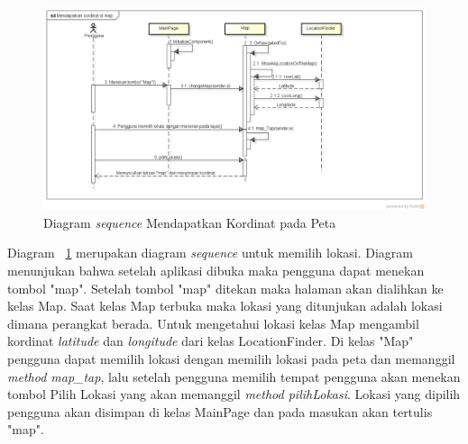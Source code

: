 \begin{figure}[h]
	\centering
		\includegraphics[scale=0.4]{Gambar/sequence/MendapatkanKordinatDiMap}
	\caption{Diagram \textit{sequence} Mendapatkan Kordinat pada Peta}
	\label{fig:sequence lokasi pada peta}
\end{figure}

\hspace{0.5cm} Diagram ~\ref{fig:sequence lokasi pada peta} merupakan diagram \textit{sequence} untuk memilih lokasi. Diagram menunjukan bahwa setelah aplikasi dibuka maka pengguna dapat menekan tombol "map". Setelah tombol "map" ditekan maka halaman akan dialihkan ke kelas Map. Saat kelas Map terbuka maka lokasi yang ditunjukan adalah lokasi dimana perangkat berada. Untuk mengetahui lokasi kelas Map mengambil kordinat \textit{latitude} dan \textit{longitude} dari kelas LocationFinder. Di kelas "Map" pengguna dapat memilih lokasi dengan memilih lokasi pada peta dan memanggil \textit{method map\_tap}, lalu setelah pengguna memilih tempat pengguna akan menekan tombol Pilih Lokasi yang akan memanggil \textit{method pilihLokasi}. Lokasi yang dipilih pengguna akan disimpan di kelas MainPage dan pada masukan akan tertulis "map". 

